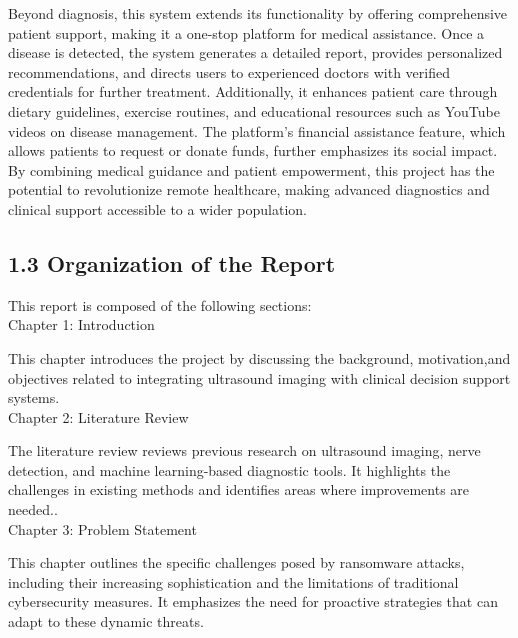 \documentclass[12pt]{article}
\begin{document}
\noindent Beyond diagnosis, this system extends its functionality by offering comprehensive patient support, making it a one-stop platform for medical assistance. Once a disease is detected, the system generates a detailed report, provides personalized recommendations, and directs users to experienced doctors with verified credentials for further treatment. Additionally, it enhances patient care through dietary guidelines, exercise routines, and educational resources such as YouTube videos on disease management. The platform’s financial assistance feature, which allows patients to request or donate funds, further emphasizes its social impact. By combining medical guidance and patient empowerment, this project has the potential to revolutionize remote healthcare, making advanced diagnostics and clinical support accessible to a wider population.
   \vspace{5pt}



\newpage
\subsection{1.3 Organization of the Report}
\vspace{5pt}
\noindent This report is composed of the following sections: \\[2pt]

\noindent Chapter 1: Introduction

\noindent This chapter introduces the project by discussing the background, motivation,and objectives related to integrating ultrasound imaging with clinical decision support systems. \\[2pt]

\noindent Chapter 2: Literature Review

\noindent The literature review reviews previous research on ultrasound imaging, nerve detection, and machine learning-based diagnostic tools. It highlights the challenges in existing methods and identifies areas where improvements are needed.. \\[2pt]

\noindent Chapter 3: Problem Statement

\noindent This chapter outlines the specific challenges posed by ransomware attacks, including their increasing sophistication and the limitations of traditional cybersecurity measures. It emphasizes the need for proactive strategies that can adapt to these dynamic threats. \\[2pt]
\end{document}
